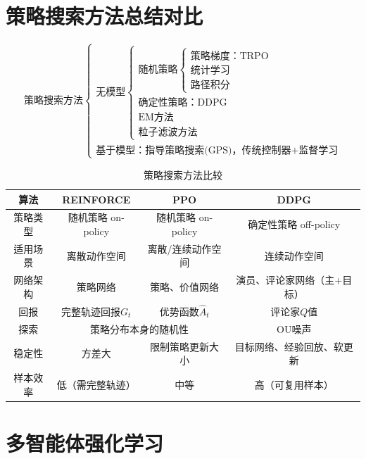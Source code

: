 \documentclass[
12pt, %
a4paper, 
oneside, %
]{scrartcl}
\begin{document}
\section{策略搜索方法总结对比}
$$
\text{策略搜索方法} \begin{cases} 
\text{无模型} \begin{cases} 
\text{随机策略} \begin{cases} 
\text{策略梯度：TRPO} \\ \text{统计学习} \\ \text{路径积分} \end{cases} \\ 
\text{确定性策略：DDPG} \\ \text{EM方法} \\ \text{粒子滤波方法} \end{cases} \\ 
\text{基于模型：指导策略搜索(GPS)，传统控制器+监督学习} \end{cases}
$$

\begin{table}[H]
\centering
\small
\begin{tabular}{|c|c|c|c|}
\hline
算法 & REINFORCE & PPO & DDPG \\
\hline
策略类型 & 随机策略 on-policy & 随机策略 on-policy & 确定性策略 off-policy \\
\hline
适用场景 & 离散动作空间 & 离散/连续动作空间 & 连续动作空间 \\
\hline
网络架构 & 策略网络 & 策略、价值网络 & 演员、评论家网络（主+目标） \\
\hline
回报 & 完整轨迹回报$ G_t $ & 优势函数$ \hat{A}_t $ & 评论家$ Q $值 \\
\hline
探索 & \multicolumn{2}{c|}{策略分布本身的随机性} & OU噪声 \\
\hline
稳定性 & 方差大 & 限制策略更新大小 & 目标网络、经验回放、软更新 \\
\hline
样本效率 & 低（需完整轨迹） & 中等 & 高（可复用样本） \\
\hline
\end{tabular}
\caption{策略搜索方法比较}
\end{table}
\section{多智能体强化学习}
\end{document}

